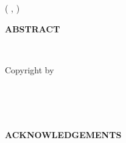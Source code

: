 \documentclass[12pt,letterpaper,twoside]{report}
\begin{document}
\begin{titlepage}
\begin{center}
    \begin{textblock}{
     }(
       , %
     )
     \centering
     \graduationYear
    \end{textblock}

\end{center}
\null\newpage
\end{titlepage}

\thispagestyle{empty} \setcounter{page}{4}
\begin{doublespace}

\centerline{\textbf{ABSTRACT}}



\end{doublespace}
\newpage
\addtocounter{page}{-2}%

\thispagestyle{empty}
\mbox{}\vspace{6in}\\
\begin{flushright}
Copyright by \\
\MakeUppercase{\authorName} \\
\graduationYear \\
\end{flushright}
\newpage


\begin{centering}
\ \vfill



\vfill
\end{centering}
\newpage


\begin{doublespace}
\centerline{
\textbf{ACKNOWLEDGEMENTS}
}



\end{doublespace}
\newpage
\end{document}
